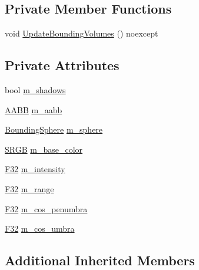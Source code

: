 \subsection*{Private Member Functions}
\begin{DoxyCompactItemize}
\item 
void \hyperlink{classmage_1_1rendering_1_1_spot_light_aa225a105edf22a1a430a1c3aa42bc490}{Update\+Bounding\+Volumes} () noexcept
\end{DoxyCompactItemize}
\subsection*{Private Attributes}
\begin{DoxyCompactItemize}
\item 
bool \hyperlink{classmage_1_1rendering_1_1_spot_light_aa2e1e955cf9fb12a9e064cc523cbbe26}{m\+\_\+shadows}
\item 
\hyperlink{classmage_1_1_a_a_b_b}{A\+A\+BB} \hyperlink{classmage_1_1rendering_1_1_spot_light_a8d79d322ce7d394d4de201478350d795}{m\+\_\+aabb}
\item 
\hyperlink{classmage_1_1_bounding_sphere}{Bounding\+Sphere} \hyperlink{classmage_1_1rendering_1_1_spot_light_a24667e6bec37a402627c20283795de95}{m\+\_\+sphere}
\item 
\hyperlink{structmage_1_1_s_r_g_b}{S\+R\+GB} \hyperlink{classmage_1_1rendering_1_1_spot_light_a79bbd00a892a19738361a52ed875f906}{m\+\_\+base\+\_\+color}
\item 
\hyperlink{namespacemage_aa97e833b45f06d60a0a9c4fc22ae02c0}{F32} \hyperlink{classmage_1_1rendering_1_1_spot_light_af91b9fc5303e5c2c5e90337f42db015c}{m\+\_\+intensity}
\item 
\hyperlink{namespacemage_aa97e833b45f06d60a0a9c4fc22ae02c0}{F32} \hyperlink{classmage_1_1rendering_1_1_spot_light_a83027e02fbeee3ee5698ebb498ff30be}{m\+\_\+range}
\item 
\hyperlink{namespacemage_aa97e833b45f06d60a0a9c4fc22ae02c0}{F32} \hyperlink{classmage_1_1rendering_1_1_spot_light_afcac44663ee8e8773eaa838ddbf9c0f2}{m\+\_\+cos\+\_\+penumbra}
\item 
\hyperlink{namespacemage_aa97e833b45f06d60a0a9c4fc22ae02c0}{F32} \hyperlink{classmage_1_1rendering_1_1_spot_light_a2152cbea4f216f8ae18550a8c9e5b5e0}{m\+\_\+cos\+\_\+umbra}
\end{DoxyCompactItemize}
\subsection*{Additional Inherited Members}



